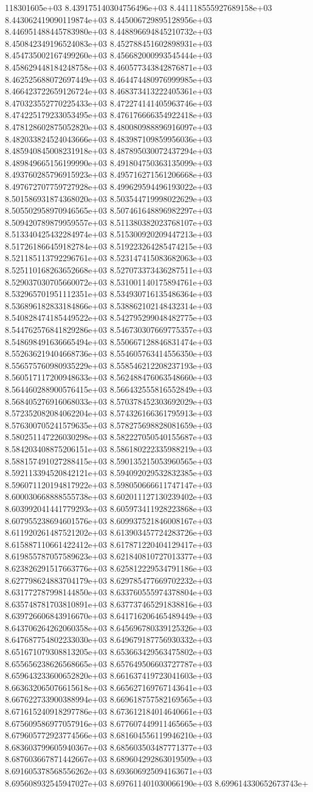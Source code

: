 118301605e+03	8.439175140304756496e+03	8.441118555927689158e+03	8.443062419090119874e+03	8.445006729895128956e+03	8.446951488445783980e+03	8.448896694845210732e+03	8.450842349196524083e+03	8.452788451602898931e+03	8.454735002167499260e+03	8.456682000993545444e+03	8.458629448184248758e+03	8.460577343842876871e+03	8.462525688072697449e+03	8.464474480976999985e+03	8.466423722659126724e+03	8.468373413222405361e+03	8.470323552770225433e+03	8.472274141405963746e+03	8.474225179233053495e+03	8.476176666354922418e+03	8.478128602875052820e+03	8.480080988896916097e+03	8.482033824524043666e+03	8.483987109859956036e+03	8.485940845008231918e+03	8.487895030072437294e+03	8.489849665156199990e+03	8.491804750363135099e+03	8.493760285796915923e+03	8.495716271561206668e+03	8.497672707759727928e+03	8.499629594496193022e+03	8.501586931874368020e+03	8.503544719998022629e+03	8.505502958970946565e+03	8.507461648896982297e+03	8.509420789879959557e+03	8.511380382023768107e+03	8.513340425432284974e+03	8.515300920209447213e+03	8.517261866459182784e+03	8.519223264285474215e+03	8.521185113792296761e+03	8.523147415083682063e+03	8.525110168263652668e+03	8.527073373436287511e+03	8.529037030705660072e+03	8.531001140175894761e+03	8.532965701951112351e+03	8.534930716135486364e+03	8.536896182833184866e+03	8.538862102148432314e+03	8.540828474185449522e+03	8.542795299048482775e+03	8.544762576841829286e+03	8.546730307669775357e+03	8.548698491636665494e+03	8.550667128846831474e+03	8.552636219404668736e+03	8.554605763414556350e+03	8.556575760980935229e+03	8.558546212208237193e+03	8.560517117200948633e+03	8.562488476063548660e+03	8.564460288900576415e+03	8.566432555816552849e+03	8.568405276916068033e+03	8.570378452303692029e+03	8.572352082084062204e+03	8.574326166361795913e+03	8.576300705241579635e+03	8.578275698828081659e+03	8.580251147226030298e+03	8.582227050540155687e+03	8.584203408875206151e+03	8.586180222335988219e+03	8.588157491027288415e+03	8.590135215053960565e+03	8.592113394520842121e+03	8.594092029532832385e+03	8.596071120194817922e+03	8.598050666611747147e+03	8.600030668888555738e+03	8.602011127130239402e+03	8.603992041441779293e+03	8.605973411928223868e+03	8.607955238694601576e+03	8.609937521846008167e+03	8.611920261487521202e+03	8.613903457724283726e+03	8.615887110661422412e+03	8.617871220404129417e+03	8.619855787057589623e+03	8.621840810727013377e+03	8.623826291517663776e+03	8.625812229534791186e+03	8.627798624883704179e+03	8.629785477669702232e+03	8.631772787998144850e+03	8.633760555974378804e+03	8.635748781703810891e+03	8.637737465291838816e+03	8.639726606843916670e+03	8.641716206465489449e+03	8.643706264262060358e+03	8.645696780339125326e+03	8.647687754802233030e+03	8.649679187756930332e+03	8.651671079308813205e+03	8.653663429563475802e+03	8.655656238626568665e+03	8.657649506603727787e+03	8.659643233600652820e+03	8.661637419723041603e+03	8.663632065076615618e+03	8.665627169767143641e+03	8.667622733900388994e+03	8.669618757582169565e+03	8.671615240918297786e+03	8.673612184014640661e+03	8.675609586977057916e+03	8.677607449911465665e+03	8.679605772923774566e+03	8.681604556119946210e+03	8.683603799605940367e+03	8.685603503487771377e+03	8.687603667871442667e+03	8.689604292863019509e+03	8.691605378568556262e+03	8.693606925094163671e+03	8.695608932545947027e+03	8.697611401030066190e+03	8.699614330652673743e+